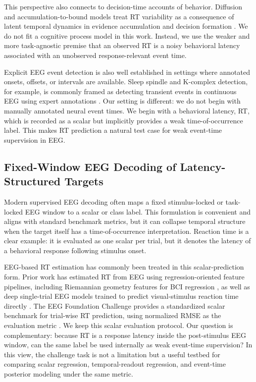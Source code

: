 \documentclass[12pt]{article}
\begin{document}
This perspective also connects to decision-time accounts of behavior. Diffusion and accumulation-to-bound models treat RT variability as a consequence of latent temporal dynamics in evidence accumulation and decision formation \citep{Ratcliff2008Diffusion,OConnell2012Supramodal,Kelly2013Internal}. We do not fit a cognitive process model in this work. Instead, we use the weaker and more task-agnostic premise that an observed RT is a noisy behavioral latency associated with an unobserved response-relevant event time.

Explicit EEG event detection is also well established in settings where annotated onsets, offsets, or intervals are available. Sleep spindle and K-complex detection, for example, is commonly framed as detecting transient events in continuous EEG using expert annotations \citep{TapiaRivas2024SEED}. Our setting is different: we do not begin with manually annotated neural event times. We begin with a behavioral latency, RT, which is recorded as a scalar but implicitly provides a weak time-of-occurrence label. This makes RT prediction a natural test case for weak event-time supervision in EEG.

\subsection{Fixed-Window EEG Decoding of Latency-Structured Targets}
Modern supervised EEG decoding often maps a fixed stimulus-locked or task-locked EEG window to a scalar or class label. This formulation is convenient and aligns with standard benchmark metrics, but it can collapse temporal structure when the target itself has a time-of-occurrence interpretation. Reaction time is a clear example: it is evaluated as one scalar per trial, but it denotes the latency of a behavioral response following stimulus onset.

EEG-based RT estimation has commonly been treated in this scalar-prediction form. Prior work has estimated RT from EEG using regression-oriented feature pipelines, including Riemannian geometry features for BCI regression \citep{Wu2017RiemannianRT}, as well as deep single-trial EEG models trained to predict visual-stimulus reaction time directly \citep{Chowdhury2020RTSensors}. The EEG Foundation Challenge provides a standardized scalar benchmark for trial-wise RT prediction, using normalized RMSE as the evaluation metric \citep{EEGFoundationChallengeArxiv2025,EEGChallengeWebsite2025}. We keep this scalar evaluation protocol. Our question is complementary: because RT is a response latency inside the post-stimulus EEG window, can the same label be used internally as weak event-time supervision? In this view, the challenge task is not a limitation but a useful testbed for comparing scalar regression, temporal-readout regression, and event-time posterior modeling under the same metric.
\end{document}
